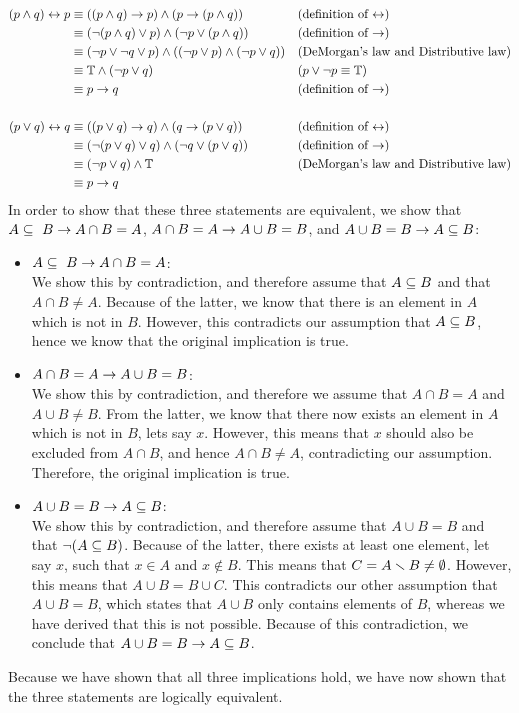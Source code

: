 \begin{solutions}
	\solution \spart \begin{align*}
	(p\wedge q)\leftrightarrow p&\equiv((p\wedge q)\rightarrow p) \wedge (p\rightarrow (p\wedge q)) && \text{(definition of $\leftrightarrow$)}\\
	&\equiv (\lnot(p\wedge q) \vee p)\wedge (\lnot p \vee (p\wedge q)) && \text{(definition of $\rightarrow$)}\\
	&\equiv (\lnot p \vee \lnot q \vee p)\wedge ((\lnot p \vee p) \wedge (\lnot p \vee q)) && \text{(DeMorgan's law and Distributive law)}\\
	&\equiv \mathbb{T} \wedge (\lnot p\vee q) &&\text{($p\vee\lnot p\equiv \mathbb{T}$)}\\
	&\equiv p\rightarrow q &&\text{(definition of $\rightarrow$)}\\ \\
	(p\vee q)\leftrightarrow q&\equiv ((p\vee q)\rightarrow q) \wedge (q\rightarrow (p\vee q)) && \text{(definition of $\leftrightarrow$)}\\
	&\equiv (\lnot (p\vee q) \vee q) \wedge (\lnot q \vee (p\vee q)) &&\text{(definition of $\rightarrow$)}\\
	&\equiv (\lnot p\vee q)\wedge \mathbb{T} &&\text{(DeMorgan's law and Distributive law)}\\
	&\equiv p\rightarrow q
	\end{align*}
	\spart In order to show that these three statements are equivalent, we show that $A\subseteq~B \rightarrow A\cap B= A$, $A\cap B= A\rightarrow A\cup B= B$, and $A\cup B = B\rightarrow A\subseteq B$:\begin{itemize}
		\item $A\subseteq~B \rightarrow A\cap B= A$:\\
		We show this by contradiction, and therefore assume that $A\subseteq B$ and that $A\cap B\neq A$. Because of the latter, we know that there is an element in $A$ which is not in $B$. However, this contradicts our assumption that $A\subseteq B$, hence we know that the original implication is true.
		\item $A\cap B= A\rightarrow A\cup B= B$:\\
		We show this by contradiction, and therefore we assume that $A\cap B= A$ and $A\cup B\neq B$. From the latter, we know that there now exists an element in $A$ which is not in $B$, lets say $x$. However, this means that $x$ should also be excluded from $A\cap B$, and hence $A\cap B\neq A$, contradicting our assumption. Therefore, the original implication is true.
		\item $A\cup B = B\rightarrow A\subseteq B$:\\
		We show this by contradiction, and therefore assume that $A\cup B = B$ and that $\lnot(A\subseteq B)$. Because of the latter, there exists at least one element, let say $x$, such that $x\in A$ and $x\not\in B$. This means that $C=A\smallsetminus B\neq\emptyset$. However, this means that $A\cup B = B\cup C$. This contradicts our other assumption that $A\cup B = B$, which states that $A\cup B$ only contains elements of $B$, whereas we have derived that this is not possible. Because of this contradiction, we conclude that $A\cup B = B\rightarrow A\subseteq B$.
	\end{itemize}
	Because we have shown that all three implications hold, we have now shown that the three statements are logically equivalent.
	

\end{solutions}
